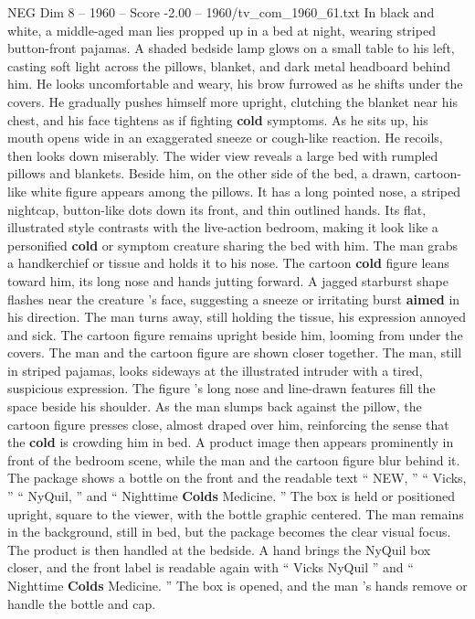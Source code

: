 \begin{textsample}{NEG Dim 8 – 1960 – Score -2.00 – 1960/tv\_com\_1960\_61.txt}  \label{ex:f8_neg_019}
In black and white, a middle-aged man lies propped up in a bed at night, wearing striped button-front pajamas.
A shaded bedside lamp glows on a small table to his left, casting soft light across the pillows, blanket, and dark metal headboard behind him.
He looks uncomfortable and weary, his brow furrowed as he shifts under the covers.
He gradually pushes himself more upright, clutching the blanket near his chest, and his face tightens as if fighting \textbf{cold} symptoms.
As he sits up, his mouth opens wide in an exaggerated sneeze or cough-like reaction.
He recoils, then looks down miserably.
The wider view reveals a large bed with rumpled pillows and blankets.
Beside him, on the other side of the bed, a drawn, cartoon-like white figure appears among the pillows.
It has a long pointed nose, a striped nightcap, button-like dots down its front, and thin outlined hands.
Its flat, illustrated style contrasts with the live-action bedroom, making it look like a personified \textbf{cold} or symptom creature sharing the bed with him.
The man grabs a handkerchief or tissue and holds it to his nose.
The cartoon \textbf{cold} figure leans toward him, its long nose and hands jutting forward.
A jagged starburst shape flashes near the creature ’s face, suggesting a sneeze or irritating burst \textbf{aimed} in his direction.
The man turns away, still holding the tissue, his expression annoyed and sick.
The cartoon figure remains upright beside him, looming from under the covers.
The man and the cartoon figure are shown closer together.
The man, still in striped pajamas, looks sideways at the illustrated intruder with a tired, suspicious expression.
The figure ’s long nose and line-drawn features fill the space beside his shoulder.
As the man slumps back against the pillow, the cartoon figure presses close, almost draped over him, reinforcing the sense that the \textbf{cold} is crowding him in bed.
A product image then appears prominently in front of the bedroom scene, while the man and the cartoon figure blur behind it.
The package shows a bottle on the front and the readable text “ NEW, ” “ Vicks, ” “ NyQuil, ” and “ Nighttime \textbf{Colds} Medicine. ” The box is held or positioned upright, square to the viewer, with the bottle graphic centered.
The man remains in the background, still in bed, but the package becomes the clear visual focus.
The product is then handled at the bedside.
A hand brings the NyQuil box closer, and the front label is readable again with “ Vicks NyQuil ” and “ Nighttime \textbf{Colds} Medicine. ” The box is opened, and the man ’s hands remove or handle the bottle and cap.

\end{textsample}
